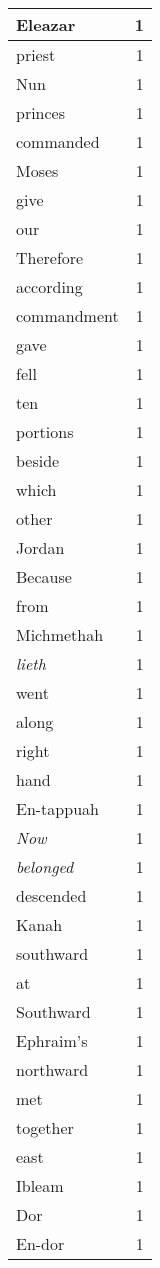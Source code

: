\begin{center}
\begin{longtable}{l|r}
Eleazar & 1 \\ \hline
priest & 1 \\ \hline
Nun & 1 \\ \hline
princes & 1 \\ \hline
commanded & 1 \\ \hline
Moses & 1 \\ \hline
give & 1 \\ \hline
our & 1 \\ \hline
Therefore & 1 \\ \hline
according & 1 \\ \hline
commandment & 1 \\ \hline
gave & 1 \\ \hline
fell & 1 \\ \hline
ten & 1 \\ \hline
portions & 1 \\ \hline
beside & 1 \\ \hline
which & 1 \\ \hline
other & 1 \\ \hline
Jordan & 1 \\ \hline
Because & 1 \\ \hline
from & 1 \\ \hline
Michmethah & 1 \\ \hline
\emph{lieth} & 1 \\ \hline
went & 1 \\ \hline
along & 1 \\ \hline
right & 1 \\ \hline
hand & 1 \\ \hline
En-tappuah & 1 \\ \hline
\emph{Now} & 1 \\ \hline
\emph{belonged} & 1 \\ \hline
descended & 1 \\ \hline
Kanah & 1 \\ \hline
southward & 1 \\ \hline
at & 1 \\ \hline
Southward & 1 \\ \hline
Ephraim's & 1 \\ \hline
northward & 1 \\ \hline
met & 1 \\ \hline
together & 1 \\ \hline
east & 1 \\ \hline
Ibleam & 1 \\ \hline
Dor & 1 \\ \hline
En-dor & 1 \\ \hline

\end{longtable}
\end{center}
